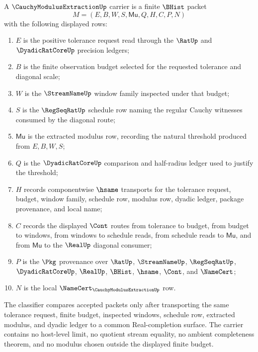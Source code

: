 \begin{definition}
\label{def:cauchy-modulus-extraction-carrier}
A $\CauchyModulusExtractionUp$ carrier is a finite $\BHist$ packet
$$
M=(E,B,W,S,\mathsf{Mu},Q,H,C,P,N)
$$
with the following displayed rows:
\begin{enumerate}
\item $E$ is the positive tolerance request read through the $\RatUp$ and $\DyadicRatCoreUp$ precision ledgers;
\item $B$ is the finite observation budget selected for the requested tolerance and diagonal scale;
\item $W$ is the $\StreamNameUp$ window family inspected under that budget;
\item $S$ is the $\RegSeqRatUp$ schedule row naming the regular Cauchy witnesses consumed by the diagonal route;
\item $\mathsf{Mu}$ is the extracted modulus row, recording the natural threshold produced from $E,B,W,S$;
\item $Q$ is the $\DyadicRatCoreUp$ comparison and half-radius ledger used to justify the threshold;
\item $H$ records componentwise $\hsame$ transports for the tolerance request, budget, window family, schedule row, modulus row, dyadic ledger, package provenance, and local name;
\item $C$ records the displayed $\Cont$ routes from tolerance to budget, from budget to windows, from windows to schedule reads, from schedule reads to $\mathsf{Mu}$, and from $\mathsf{Mu}$ to the $\RealUp$ diagonal consumer;
\item $P$ is the $\Pkg$ provenance over $\RatUp$, $\StreamNameUp$, $\RegSeqRatUp$, $\DyadicRatCoreUp$, $\RealUp$, $\BHist$, $\hsame$, $\Cont$, and $\NameCert$;
\item $N$ is the local $\NameCert_{\CauchyModulusExtractionUp}$ row.
\end{enumerate}
The classifier compares accepted packets only after transporting the same tolerance request, finite budget, inspected windows, schedule row, extracted modulus, and dyadic ledger to a common Real-completion surface. The carrier contains no host-level limit, no quotient stream equality, no ambient completeness theorem, and no modulus chosen outside the displayed finite budget.
\end{definition}


